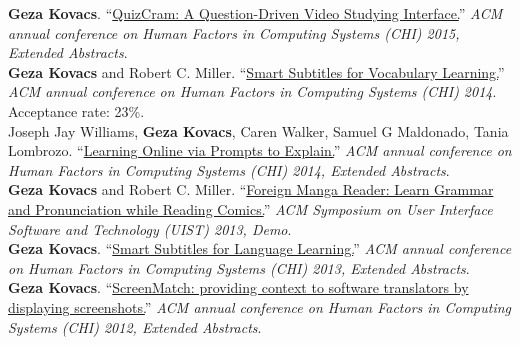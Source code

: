 \textbf{Geza Kovacs}. ``\href{https://hci.stanford.edu/publications/2015/quizcram/quizcram-chi2015.pdf}{QuizCram: A Question-Driven Video Studying Interface.}'' \emph{ACM annual conference on Human Factors in Computing Systems (CHI) 2015, Extended Abstracts}.\\

\textbf{Geza Kovacs} {\small and Robert C. Miller.} ``\href{http://up.csail.mit.edu/other-pubs/chi2014-smartsubs.pdf}{Smart Subtitles for Vocabulary Learning.}'' \emph{ACM annual conference on Human Factors in Computing Systems (CHI) 2014}. Acceptance rate: 23\%.\\

{\small Joseph Jay Williams,} \textbf{Geza Kovacs}, {\small Caren Walker, Samuel G Maldonado, Tania Lombrozo.} ``\href{https://hci.stanford.edu/publications/2014/explain/explain-chi2014.pdf}{Learning Online via Prompts to Explain.}'' \emph{ACM annual conference on Human Factors in Computing Systems (CHI) 2014, Extended Abstracts}.\\

\textbf{Geza Kovacs} {\small and Robert C. Miller.} ``\href{http://up.csail.mit.edu/other-pubs/uist2013-mangareader.pdf}{Foreign Manga Reader: Learn Grammar and Pronunciation while Reading Comics.}'' \emph{ACM Symposium on User Interface Software and Technology (UIST) 2013, Demo}.\\

\textbf{Geza Kovacs}. ``\href{http://up.csail.mit.edu/other-pubs/chi2013-smartsubs.pdf}{Smart Subtitles for Language Learning.}'' \emph{ACM annual conference on Human Factors in Computing Systems (CHI) 2013, Extended Abstracts}.\\ %

\textbf{Geza Kovacs}. ``\href{http://up.csail.mit.edu/other-pubs/chi2012-screenshots-for-translation-context.pdf}{ScreenMatch: providing context to software translators by displaying screenshots.}'' \emph{ACM annual conference on Human Factors in Computing Systems (CHI) 2012, Extended Abstracts}.\\ %
